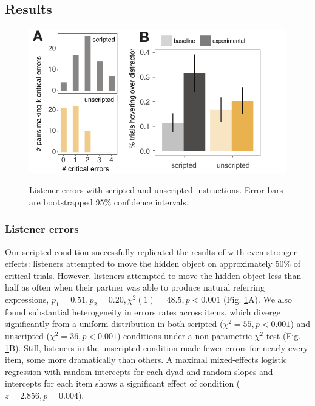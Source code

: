 \documentclass[manuscript]{stjour}
\begin{document}
\subsection{Results}

 \begin{figure}[t!]
 \begin{center}
 \vspace{-.25cm}
 \includegraphics[scale=1]{figures/resultsFig_v1.pdf}
 \vspace{-.5cm}
 \caption{Listener errors with scripted and unscripted instructions. Error bars are bootstrapped 95\% confidence intervals.}
 \vspace{-.5cm}
 \label{fig:exp1results}
 \end{center}
 \end{figure}

\subsubsection{Listener errors}

Our scripted condition successfully replicated the results of \cite{KeysarLinBarr03_LimitsOnTheoryOfMindUse} with even stronger effects: listeners attempted to move the hidden object on approximately 50\% of critical trials. However, listeners attempted to move the hidden object less than half as often when their partner was able to produce natural referring expressions, $p_1 = 0.51, p_2 = 0.20, \chi^2(1) = 48.5, p < 0.001$ (Fig. \ref{fig:exp1results}A). We also found substantial heterogeneity in errors rates across items, which diverge significantly from a uniform distribution in both scripted ($\chi^2=55, p < 0.001$) and unscripted ($\chi^2=36, p <0.001$) conditions under a non-parametric $\chi^2$ test (Fig. \ref{fig:exp1results}B). Still, listeners in the unscripted condition made fewer errors for nearly every item, some more dramatically than others. A maximal mixed-effects logistic regression with random intercepts for each dyad and random slopes and intercepts for each item shows a significant effect of condition ($z = 2.856, p = 0.004$). %
\end{document}
